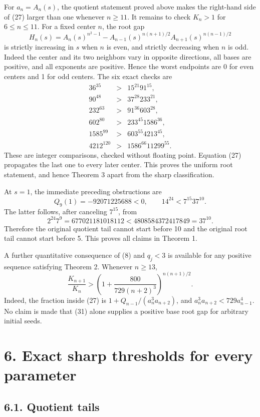 \documentclass[
  11pt,
  a4paper,
]{article}
\begin{document}
For \(a_n=A_n(s)\), the quotient statement proved above makes the
right-hand side of (27) larger than one whenever \(n\ge11\). It remains
to check \(K_n>1\) for \(6\le n\le11\). For a fixed center \(n\), the
root gap \[
H_n(s)=A_n(s)^{n^2-1}
-A_{n-1}(s)^{n(n+1)/2}A_{n+1}(s)^{n(n-1)/2}
\tag{28}
\] is strictly increasing in \(s\) when \(n\) is even, and strictly
decreasing when \(n\) is odd. Indeed the center and its two neighbors
vary in opposite directions, all bases are positive, and all exponents
are positive. Hence the worst endpoints are 0 for even centers and 1 for
odd centers. The six exact checks are \[
\begin{array}{rcl}
36^{35}&>&15^{21}91^{15},\\
90^{48}&>&37^{28}233^{21},\\
232^{63}&>&91^{36}603^{28},\\
602^{80}&>&233^{45}1586^{36},\\
1585^{99}&>&603^{55}4213^{45},\\
4212^{120}&>&1586^{66}11299^{55}.
\end{array}
\tag{29}
\] These are integer comparisons, checked without floating point.
Equation (27) propagates the last one to every later center. This proves
the uniform root statement, and hence Theorem 3 apart from the sharp
classification.

At \(s=1\), the immediate preceding obstructions are \[
Q_9(1)=-92071225688<0,
\qquad14^{24}<7^{15}37^{10}.
\tag{30}
\] The latter follows, after canceling \(7^{15}\), from \[
2^{24}7^9=677021181018112
<4808584372417849=37^{10}.
\] Therefore the original quotient tail cannot start before 10 and the
original root tail cannot start before 5. This proves all claims in
Theorem 1.

A further quantitative consequence of (8) and \(q_j<3\) is available for
any positive sequence satisfying Theorem 2. Whenever \(n\ge13\), \[
\frac{K_{n+1}}{K_n}>
\left(1+\frac{800}{729(n+2)^3}\right)^{n(n+1)/2}.
\tag{31}
\] Indeed, the fraction inside (27) is \(1+Q_{n-1}/(a_n^3a_{n+2})\), and
\(a_n^3a_{n+2}<729a_{n-1}^4\). No claim is made that (31) alone supplies
a positive base root gap for arbitrary initial seeds.

\section{6. Exact sharp thresholds for every
parameter}\label{exact-sharp-thresholds-for-every-parameter}

\subsection{6.1. Quotient tails}\label{quotient-tails}
\end{document}
